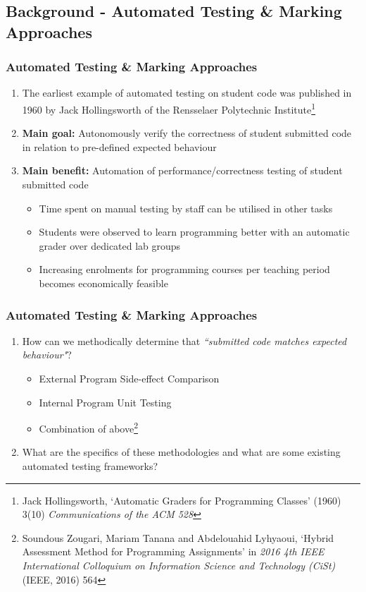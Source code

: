 \documentclass[xcolor]{beamer}
\begin{document}
\subsection{Background - Automated Testing \& Marking Approaches}
\begin{frame}
	\frametitle{Automated Testing \& Marking Approaches}
	\begin{enumerate}
		\setlength\itemsep{1em}
		\item The earliest example of automated testing on student code was published in 1960 by Jack Hollingsworth of the Rensselaer Polytechnic Institute\footnote{Jack Hollingsworth, ‘Automatic Graders for Programming Classes’ (1960) 3(10) \textit{Communications of the ACM 528}}
			\pause
		\item \textbf{Main goal:} Autonomously verify the correctness of student submitted code in relation to pre-defined expected behaviour
			\pause
		\item \textbf{Main benefit:} Automation of performance/correctness testing of student submitted code
		\begin{itemize} 
			\item Time spent on manual testing by staff can be utilised in other tasks
				\pause
			\item Students were observed to learn programming better with an automatic grader over dedicated lab groups 
				\pause
			\item Increasing enrolments for programming courses per teaching period becomes economically feasible 
		\end{itemize}
	\end{enumerate}
\end{frame}
\begin{frame}
	\frametitle{Automated Testing \& Marking Approaches}
	\begin{enumerate}
		\setlength\itemsep{1em}
		\item How can we methodically determine that \textit{``submitted code matches expected behaviour"}?
			\pause
		\begin{itemize} 
			\item External Program Side-effect Comparison
				\pause
			\item Internal Program Unit Testing
				\pause
			\item Combination of above\footnote{Soundous Zougari, Mariam Tanana and Abdelouahid Lyhyaoui, ‘Hybrid Assessment Method for Programming Assignments’ in \textit{2016 4th IEEE International Colloquium on Information Science and Technology (CiSt)} (IEEE, 2016) 564}
				\pause
		\end{itemize}
		\item What are the specifics of these methodologies and what are some existing automated testing frameworks?
	\end{enumerate}
\end{frame}
\end{document}
